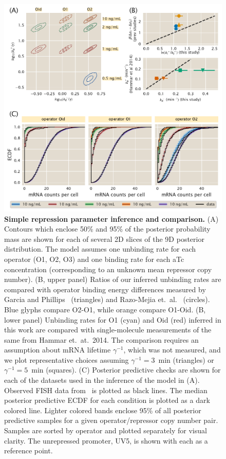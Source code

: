 \begin{figure}%
\centering
\includegraphics[width=\textwidth]{../figures/main/fig04.pdf}
\caption{\textbf{Simple repression parameter inference and comparison.}
(A) Contours which enclose 50\% and 95\% of the posterior
probability mass are shown for each of several 2D slices of
the 9D posterior distribution. The model assumes one
unbinding rate for each operator (O1, O2, O3) and one binding rate for each aTc
concentration (corresponding to an unknown mean repressor copy number).
(B, upper panel)
Ratios of our inferred unbinding rates are compared with
operator binding energy differences measured by
Garcia and Phillips~\cite{Garcia2011a} (triangles) and
Razo-Mejia et.\ al.~\cite{Razo-Mejia2018} (circles).
Blue glyphs compare O2-O1, while orange compare O1-Oid.
(B, lower panel)
Unbinding rates for O1 (cyan) and Oid (red) inferred in this work are compared with
single-molecule measurements of the same from Hammar et.\ at.\ 2014.
The comparison requires an assumption about mRNA lifetime
$\gamma^{-1}$, which was not measured, and we plot representative
choices assuming $\gamma^{-1}=3$~min (triangles) or $\gamma^{-1}=5$~min (squares).
(C) Posterior predictive checks are shown for each of the
datasets used in the inference of the model in (A). Observed FISH
data from~\cite{Jones2014} is plotted as black lines. The median
posterior predictive ECDF for each condition is plotted as a dark
colored line. Lighter colored bands enclose 95\% of all posterior
predictive samples for a given operator/repressor copy number pair.
Samples are sorted by operator and plotted separately for visual clarity.
The unrepressed promoter, UV5, is shown with each as a reference point.
}
\label{fig4:repressed_post_full}
\end{figure}

